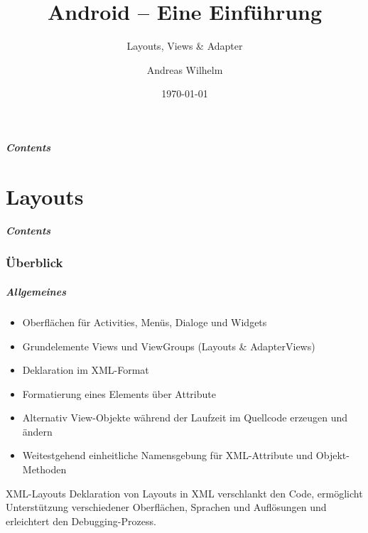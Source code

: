 \title{Android -- Eine Einführung}
\subtitle{Layouts, Views \& Adapter}
\author[A. Wilhelm]{Andreas Wilhelm}
\titlegraphic{}
\date{\today}

\begin{frame}[plain]
  \titlepage
\end{frame}

\section[Contents]{}
\begin{frame}
	\frametitle{Contents}
	\tableofcontents[onlyparts]
\end{frame}

\part{Layouts}
\frame{\partpage}
\begin{frame}
	\frametitle{Contents}
	\tableofcontents[]
\end{frame}

\section{Überblick}
\begin{frame}
   \frametitle{Allgemeines}
   \begin{itemize}
      \item Oberflächen für Activities, Menüs, Dialoge und Widgets
      \item Grundelemente Views und ViewGroups (Layouts \& AdapterViews)
      \item Deklaration im XML-Format
      \item Formatierung eines Elements über Attribute
      \item Alternativ View-Objekte während der Laufzeit im Quellcode 
         erzeugen und ändern
      \item Weitestgehend einheitliche Namensgebung für XML-Attribute 
         und Objekt-Methoden
   \end{itemize}

   \begin{alertblock}{XML-Layouts}
      Deklaration von Layouts in XML verschlankt den Code, 
      ermöglicht Unterstützung verschiedener Oberflächen, Sprachen 
      und Auflösungen und erleichtert den Debugging-Prozess.
   \end{alertblock}
\end{frame}


